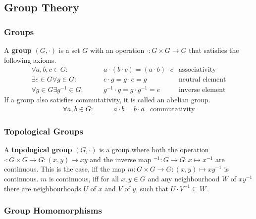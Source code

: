 \subsection{Group Theory}

\subsubsection{Groups}

A \textbf{group} $(G, \cdot)$ is a set $G$ with an operation $\cdot: G \times G \to G$ that satisfies the following axioms.
\begin{align}
    \forall a, b, c \in G: \qquad & a \cdot (b \cdot c) = (a \cdot b) \cdot c & \text{associativity} \\
    \exists e \in G \forall g \in G: \qquad & e \cdot g = g \cdot e = g & \text{neutral element} \\
    \forall g \in G \exists g^{-1} \in G: \qquad & g^{-1} \cdot g = g \cdot g^{-1} = e & \text{inverse element}
\end{align}
If a group also satisfies commutativity, it is called an abelian group.
\begin{align}
    \forall a, b \in G: \qquad & a \cdot b = b \cdot a & \text{commutativity}
\end{align}


\subsubsection{Topological Groups}

A \textbf{topological group} $(G, \cdot)$ is a group where both the operation $\cdot: G \times G \to G: (x, y) \mapsto xy$ and the inverse map $^{-1}: G \to G: x \mapsto x^{-1}$ are continuous.
This is the case, iff the map $m: G \times G \to G: (x, y) \mapsto xy^{-1}$ is continuous.
$m$ is continuous, iff for all $x, y \in G$ and any neighbourhood $W$ of $xy^{-1}$ there are neighbourhoods $U$ of $x$ and $V$ of $y$, such that $U \cdot V^{-1} \subseteq W$.


\subsubsection{Group Homomorphisms}

